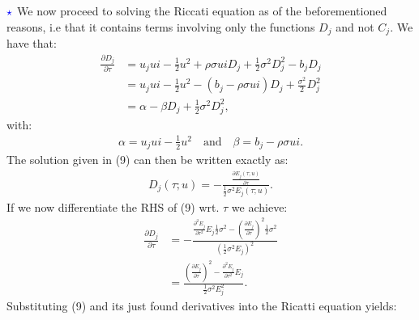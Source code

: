 \documentclass[12pt]{article}
\numberwithin{equation}{section}
\begin{document}
$\textcolor{blue}{\star}$ We now proceed to solving the Riccati equation as of
the beforementioned reasons, i.e that it contains terms involving only the
functions $D_j$ and not $C_j$. We have that:
\begin{align*}
    \frac{\partial D_j}{\partial \tau}&=u_jui-\frac{1}{2}u^2+\rho\sigma u iD_j+\frac{1}{2}\sigma^2D_j^2-b_jD_j\\
    &=u_jui-\frac{1}{2}u^2-(b_j-\rho\sigma u i)D_j+\frac{\sigma^2}{2}D_j^2\\
    &=\alpha-\beta D_j+\frac{1}{2}\sigma^2D_j^2,
\end{align*}
with:
\begin{align*}
    \alpha = u_j ui - \frac{1}{2}u^2 \quad \text{and} \quad \beta=b_j-\rho \sigma u i.
\end{align*}
The solution given in (9) can then be written exactly as:
\begin{align*}
    D_j(\tau;u)=-\frac{\frac{\partial E_j(\tau;u)}{\partial \tau}}{\frac{1}{2}\sigma^2E_j(\tau;u)}.
\end{align*}
If we now differentiate the RHS of (9) wrt. $\tau$ we achieve:
\begin{align*}
        \frac{\partial D_j}{\partial \tau}&=-\frac{\frac{\partial^2 E_j}{\partial\tau^2 }E_j\frac{1}{2}\sigma^2- \left ( \frac{\partial E_j}{\partial \tau}\right )^2 \frac{1}{2}\sigma^2}{\left ( \frac{1}{2}\sigma^2 E_j\right )^2}\\
        &=\frac{\left ( \frac{\partial E_j}{\partial \tau}\right )^2-\frac{\partial^2 E_j}{\partial\tau^2 }E_j}{\frac{1}{2}\sigma^2 E_j^2}.
\end{align*}
Substituting (9) and its just found derivatives into the Ricatti equation
yields:
\end{document}
